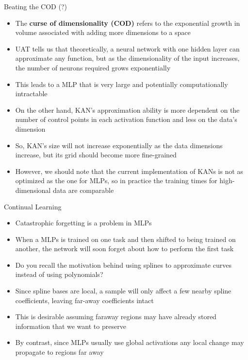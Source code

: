 \begin{frame}{Beating the COD (?)}
   \begin{itemize}
       \item The \textbf{curse of dimensionality (COD)} refers to the exponential growth in volume associated with adding more dimensions to a space \vspace{0.3em}
       \item UAT tells us that theoretically, a neural network with one hidden layer can approximate any function, but as the dimensionality of the input increases, the number of neurons required grows exponentially \vspace{0.3em}
       \item This leads to a MLP that is very large and potentially computationally intractable \vspace{0.3em}
       \item On the other hand, KAN's approximation ability is more dependent on the number of control points in each activation function and less on the data's dimension \vspace{0.3em}
       \item So, KAN's size will not increase exponentially as the data dimensions increase, but its grid should become more fine-grained \vspace{0.3em}
       \item However, we should note that the current implementation of KANs is not as optimized as the one for MLPs, so in practice the training times for high-dimensional data are comparable
   \end{itemize}
\end{frame}


\begin{frame}{Continual Learning}
   \begin{itemize}
       \item Catastrophic forgetting is a problem in MLPs \vspace{0.3em}
       \item When a MLPs is trained on one task and then  shifted to being trained on another, the network will soon forget about how to perform the first task \vspace{0.3em}
       \item Do you recall the motivation behind using splines to approximate curves instead of using polynomials?  \vspace{0.3em}
       \item Since spline bases are local, a sample will only affect a few nearby spline coefficients, leaving far-away coefficients intact \vspace{0.3em}
       \item This is desirable assuming faraway regions may have already stored information that we want to preserve \vspace{0.3em}
       \item By contrast, since MLPs usually use global activations any local change may propagate to regions far away \vspace{0.3em}
   \end{itemize}
\end{frame}